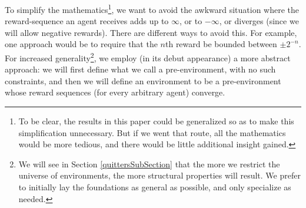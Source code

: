 \documentclass[twoside,11pt]{article}
\begin{document}
To simplify the mathematics\footnote{To be clear, the results in this paper
could be generalized so as to make this simplification unnecessary.
But if we went that route, all the
mathematics would be more tedious, and there would be little additional
insight gained.}, we want to avoid the awkward situation where
the reward-sequence an agent receives adds up to $\infty$, or to $-\infty$,
or diverges (since we will allow negative rewards). There are different ways
to avoid this. For example, one
approach would be to require that the $n$th reward be bounded
between $\pm 2^{-n}$. For increased
generality\footnote{We will see in Section \ref{quittersSubSection} that the
more we restrict
the universe of environments, the more structural properties will result. We prefer
to initially lay the foundations as general as possible, and only specialize as
needed.},
we employ (in its debut appearance) a more
abstract approach: we will first define what we call a pre-environment,
with no such constraints, and then we will define an environment to be
a pre-environment whose reward sequences (for every arbitrary agent) converge.
\end{document}
